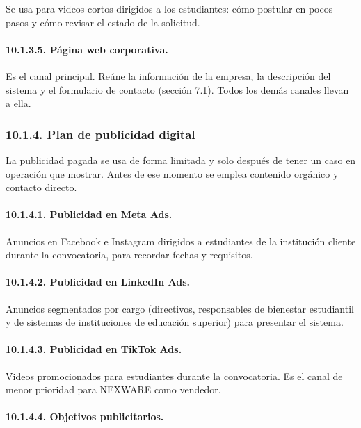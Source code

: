 Se usa para videos cortos dirigidos a los estudiantes: cómo postular en pocos pasos y cómo revisar el estado de la solicitud.

\paragraph{10.1.3.5. Página web corporativa.}

Es el canal principal. Reúne la información de la empresa, la descripción del sistema y el formulario de contacto (sección 7.1). Todos los demás canales llevan a ella.

\subsubsection{10.1.4. Plan de publicidad digital}

La publicidad pagada se usa de forma limitada y solo después de tener un caso en operación que mostrar. Antes de ese momento se emplea contenido orgánico y contacto directo.

\paragraph{10.1.4.1. Publicidad en Meta Ads.}

Anuncios en Facebook e Instagram dirigidos a estudiantes de la institución cliente durante la convocatoria, para recordar fechas y requisitos.

\paragraph{10.1.4.2. Publicidad en LinkedIn Ads.}

Anuncios segmentados por cargo (directivos, responsables de bienestar estudiantil y de sistemas de instituciones de educación superior) para presentar el sistema.

\paragraph{10.1.4.3. Publicidad en TikTok Ads.}

Videos promocionados para estudiantes durante la convocatoria. Es el canal de menor prioridad para NEXWARE como vendedor.

\paragraph{10.1.4.4. Objetivos publicitarios.}


